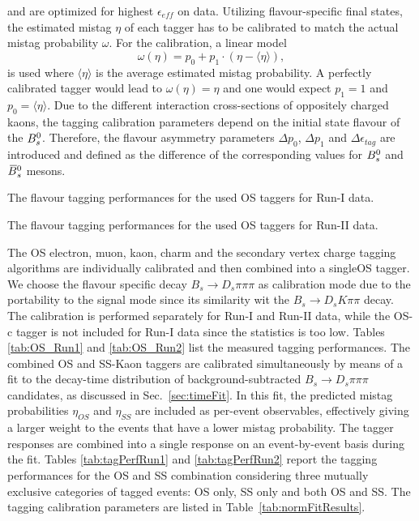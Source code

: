 and are optimized for highest $\epsilon_{eff}$ on data.
Utilizing flavour-specific final states, the estimated mistag $\eta$ of each tagger has to be calibrated to match the actual mistag probability $\omega$.
For the calibration, a linear model
\begin{equation}
\label{eq: mistagCalibration}
\omega(\eta) = p_{0} + p_{1} \cdot (\eta - \langle \eta \rangle), 
\end{equation}
is used where $\langle \eta \rangle$ is the average estimated mistag probability.
A perfectly calibrated tagger would lead to $\omega(\eta) = \eta$ and one would expect $p_{1} = 1$ and $p_{0} = \langle \eta \rangle$.
Due to the different interaction cross-sections of oppositely charged kaons, the tagging calibration parameters depend on the initial state flavour of the ${{B}^0_{s}}$.
Therefore, the flavour asymmetry parameters $\Delta p_{0}$, $\Delta p_{1}$ and $\Delta\epsilon_{tag}$ are introduced and defined as the difference of the corresponding values for ${{B}^0_{s}}$ and ${{\kern 0.18em\overline{\kern -0.18em B}{}}{}^0_{s}}$ mesons.

\begin{table}[h]
\centering
\caption{The flavour tagging performances for the used OS taggers for Run-I data.}
\resizebox{\linewidth}{!}{
        
}
\label{tab:OS_Run1}
%
\caption{The flavour tagging performances for the used OS taggers for Run-II data.}
\resizebox{\linewidth}{!}{
        
}
\label{tab:OS_Run2}
\end{table}

The OS electron, muon, kaon, charm and the secondary vertex charge tagging algorithms are individually calibrated and then combined into a singleOS tagger. 
We choose the flavour specific decay  $B_s \to D_s \pi\pi\pi$ as calibration mode due to the portability to the signal mode since its similarity wit the $B_s \to D_s K\pi\pi$ decay.
The calibration is performed separately for Run-I and Run-II data, while the OS-c tagger is not included for Run-I data since the statistics is too low.
Tables \ref{tab:OS_Run1} and \ref{tab:OS_Run2} list the measured tagging performances.\newline
The combined OS and SS-Kaon taggers are calibrated simultaneously by means of a fit to the decay-time distribution of background-subtracted $B_s \to D_s \pi\pi\pi$ candidates, as discussed in Sec.~\ref{sec:timeFit}.
In this fit, the predicted mistag probabilities $\eta_{OS}$ and $\eta_{SS}$ are included as per-event observables, effectively giving a larger weight to the events that have a lower mistag probability.
The tagger responses are combined into a single response on an event-by-event basis during the fit.
Tables \ref{tab:tagPerfRun1} and \ref{tab:tagPerfRun2} report the tagging performances for the OS and SS combination
considering three mutually exclusive categories of tagged events: OS only, SS only and both OS and SS.
The tagging calibration parameters are listed in Table~\ref{tab:normFitResults}.


